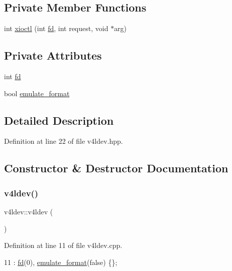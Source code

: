 \subsection*{Private Member Functions}
\begin{DoxyCompactItemize}
\item 
int \hyperlink{classv4ldev_ab93cb1ab18254ca362310b006bd2552d}{xioctl} (int \hyperlink{classv4ldev_a2cd44be3be75a19ab8bec12b28e29142}{fd}, int request, void $\ast$arg)
\end{DoxyCompactItemize}
\subsection*{Private Attributes}
\begin{DoxyCompactItemize}
\item 
int \hyperlink{classv4ldev_a2cd44be3be75a19ab8bec12b28e29142}{fd}
\item 
bool \hyperlink{classv4ldev_a5edb19bf69f780a3b2bcf1d639ec2a87}{emulate\+\_\+format}
\end{DoxyCompactItemize}


\subsection{Detailed Description}


Definition at line 22 of file v4ldev.\+hpp.



\subsection{Constructor \& Destructor Documentation}
\mbox{\label{classv4ldev_a54f840014fd707c2508efcc7a21d031e}} 
\subsubsection{\texorpdfstring{v4ldev()}{v4ldev()}}
{\footnotesize\ttfamily v4ldev\+::v4ldev (\begin{DoxyParamCaption}{ }\end{DoxyParamCaption})}



Definition at line 11 of file v4ldev.\+cpp.


\begin{DoxyCode}
11 : \hyperlink{classv4ldev_a2cd44be3be75a19ab8bec12b28e29142}{fd}(0), \hyperlink{classv4ldev_a5edb19bf69f780a3b2bcf1d639ec2a87}{emulate\_format}(\textcolor{keyword}{false}) \{\};
\end{DoxyCode}
\mbox{\label{classv4ldev_ab65f03847a5dcd1f19bcfe33f391740f}} 
